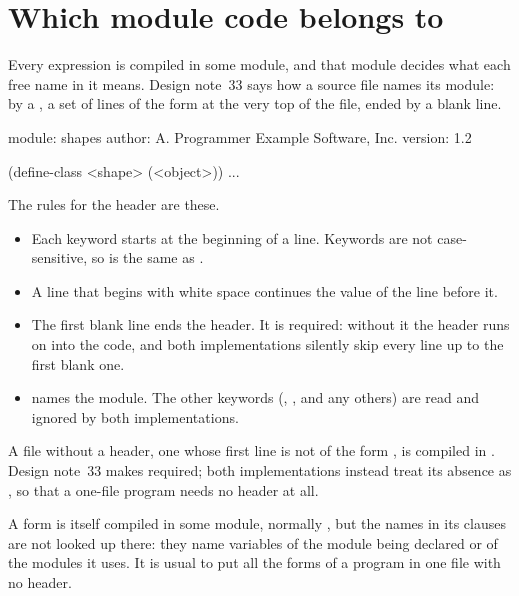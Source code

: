 \section{Which module code belongs to}\label{sec:modules-header}

Every expression is compiled in some module, and that module decides
what each free name in it means. Design note~33 says how a source file
names its module: by a , a set of lines of the form
 at the very top of the file, ended by a blank line.

\begin{dylan}
module: shapes
author: A. Programmer
        Example Software, Inc.
version: 1.2

(define-class <shape> (<object>))
...
\end{dylan}

\noindent
The rules for the header are these.

\begin{itemize}
\item Each keyword starts at the beginning of a line. Keywords are not
  case-sensitive, so  is the same as .
\item A line that begins with white space continues the value of the
  line before it.
\item The first blank line ends the header. It is required: without it
  the header runs on into the code, and both implementations silently
  skip every line up to the first blank one.
\item {} names the module. The other keywords
  (, ,  and any others) are
  read and ignored by both implementations.
\end{itemize}

\noindent
A file without a header, one whose first line is not of the form
, is compiled in . Design note~33
makes  required; both implementations instead treat its
absence as , so that a one-file program needs no
header at all.

A  form is itself compiled in some module, normally
, but the names in its clauses are not looked up there:
they name variables of the module being declared or of the modules it
uses. It is usual to put all the  forms of a program
in one file with no header.

